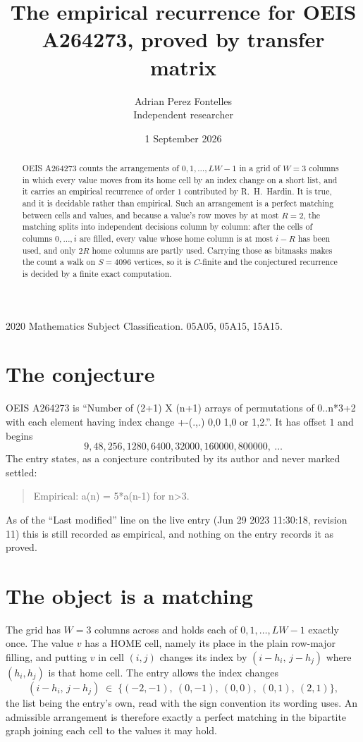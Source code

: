 \documentclass[11pt,a4paper]{article}
\title{The empirical recurrence for OEIS A264273, proved by transfer matrix}
\author{Adrian Perez Fontelles\\ \small Independent researcher}
\date{1 September 2026}
\theoremstyle{plain}
\theoremstyle{definition}
\begin{document}
\maketitle

\begin{abstract}
OEIS A264273 counts the arrangements of $0,1,\dots,LW-1$ in a grid of $W=3$ columns in which
every value moves from its home cell by an index change on a short list, and it carries an
empirical recurrence of order $1$ contributed by R.~H.~Hardin. It is true, and it is
decidable rather than empirical. Such an arrangement is a perfect matching between cells and
values, and because a value's row moves by at most $R=2$, the matching splits into
independent decisions column by column: after the cells of columns $0,\dots,i$ are filled,
every value whose home column is at most $i-R$ has been used, and only $2R$ home columns are
partly used. Carrying those as bitmasks makes the count a walk on $S=4096$ vertices, so it is
$C$-finite and the conjectured recurrence is decided by a finite exact computation.
\end{abstract}

\noindent\small 2020 Mathematics Subject Classification. 05A05, 05A15, 15A15.\normalsize

\section{The conjecture}

OEIS A264273 is ``Number of (2+1) X (n+1) arrays of permutations of 0..n*3+2 with each element having index change +-(.,.) 0,0 1,0 or 1,2.''. It has offset $1$ and begins
\[
9, 48, 256, 1280, 6400, 32000, 160000, 800000,\ \dots
\]
The entry states, as a conjecture contributed by its author and never marked settled:
\begin{quote}
Empirical: a(n) = 5*a(n-1) for n>3.
\end{quote}
As of the ``Last modified'' line on the live entry (Jun 29 2023 11:30:18, revision 11) this is still
recorded as empirical, and nothing on the entry records it as proved.

\section{The object is a matching}

The grid has $W=3$ columns across and holds each of $0,1,\dots,LW-1$ exactly once. The value
$v$ has a HOME cell, namely its place in the plain row-major filling, and putting $v$ in cell
$(i,j)$ changes its index by $(i-h_i,\,j-h_j)$ where $(h_i,h_j)$ is that home cell. The entry
allows the index changes
\[
(i-h_i,\,j-h_j)\;\in\;\{(-2,-1),\ (0,-1),\ (0,0),\ (0,1),\ (2,1)\},
\]
the list being the entry's own, read with the sign convention its wording uses. An admissible
arrangement is therefore exactly a perfect matching in the bipartite graph joining each cell to
the values it may hold.
\end{document}
